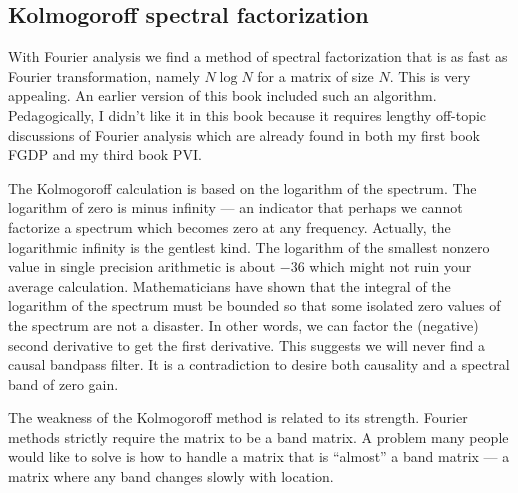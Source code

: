 \subsection{Kolmogoroff spectral factorization}
With Fourier analysis we find a method of spectral factorization
that is as fast as Fourier transformation,
namely $N\log N$ for a matrix of size $N$.
This is very appealing.
An earlier
version of this book included such an algorithm.
Pedagogically, I didn't like it in this book because it
requires lengthy off-topic discussions of Fourier analysis
which are already found in both my first book FGDP and my third book PVI.

\par
The Kolmogoroff calculation is based on the logarithm of the spectrum.
The logarithm of zero is minus infinity --- an indicator that
perhaps we cannot factorize a spectrum which becomes zero at any frequency.
Actually, the logarithmic infinity is the gentlest kind.
The logarithm of the smallest nonzero value in single precision
arithmetic is about $-36$ which might not ruin your average calculation.
Mathematicians have shown that the integral of the logarithm of
the spectrum must be bounded so that some isolated zero values
of the spectrum are not a disaster.  In other words, we can factor
the (negative) second derivative to get the first derivative.
This suggests we will never find a causal bandpass filter.
It is a contradiction to desire both
causality and a spectral band of zero gain.

\par
The weakness of the Kolmogoroff method is related to its strength.
Fourier methods strictly require the matrix to be a band matrix.
A problem many people would like to solve is how to handle a matrix
that is ``almost'' a band matrix --- a matrix where any band
changes slowly with location.

